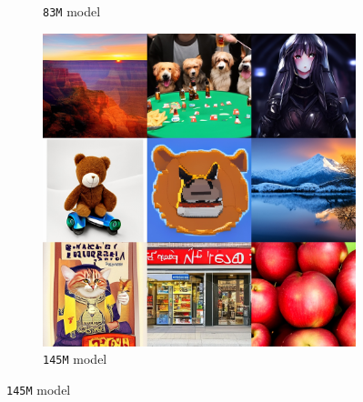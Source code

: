\begin{figure}[!t]
\begin{subfigure}[b]{0.32\textwidth}
    \caption{\texttt{83M} model}
    \end{subfigure}
    \begin{subfigure}[b]{0.32\textwidth}
    \centering
    \includegraphics[width=\textwidth]{cp2/figures/t2i/c128.jpg}
    \caption{\texttt{145M} model}
    \end{subfigure}
    \hfill


\end{figure}
